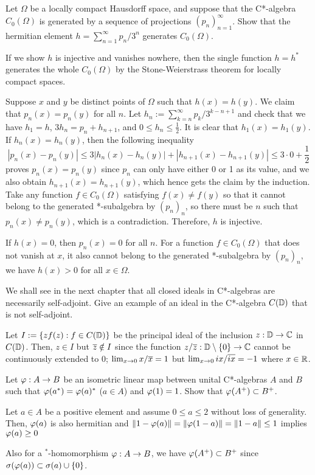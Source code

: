 \documentclass{../solution}
\begin{document}
\begin{prb}
Let $\Omega$ be a locally compact Hausdorff space, and suppose that the C*-algebra $C_0(\Omega)$ is generated by a sequence of projections $(p_n)_{n=1}^\infty$.
Show that the hermitian element $h=\sum_{n=1}^\infty p_n/3^n$ generates $C_0(\Omega)$.
\end{prb}
\begin{sol}
If we show $h$ is injective and vanishes nowhere, then the single function $h=h^*$ generates the whole $C_0(\Omega)$ by the Stone-Weierstrass theorem for locally compact spaces.

Suppose $x$ and $y$ be distinct points of $\Omega$ such that $h(x)=h(y)$.
We claim that $p_n(x)=p_n(y)$ for all $n$.
Let $h_n:=\sum_{k=n}^\infty p_k/3^{k-n+1}$ and check that we have $h_1=h$, $3h_n=p_n+h_{n+1}$, and $0\le h_n\le\frac12$.
It is clear that $h_1(x)=h_1(y)$.
If $h_n(x)=h_n(y)$, then the following inequality
\[|p_n(x)-p_n(y)|\le3|h_n(x)-h_n(y)|+|h_{n+1}(x)-h_{n+1}(y)|\le3\cdot0+\frac12\]
proves $p_n(x)=p_n(y)$ since $p_n$ can only have either 0 or 1 as its value, and we also obtain $h_{n+1}(x)=h_{n+1}(y)$, which hence gets the claim by the induction.
Take any function $f\in C_0(\Omega)$ satisfying $f(x)\ne f(y)$ so that it cannot belong to the generated *-subalgebra by $(p_n)_n$, so there must be $n$ such that $p_n(x)\ne p_n(y)$, which is a contradiction.
Therefore, $h$ is injective.

If $h(x)=0$, then $p_n(x)=0$ for all $n$.
For a function $f\in C_0(\Omega)$ that does not vanish at $x$, it also cannot belong to the generated *-subalgebra by $(p_n)_n$, we have $h(x)>0$ for all $x\in\Omega$.
\end{sol}


\begin{prb}
We shall see in the next chapter that all closed ideals in C*-algebras are necessarily self-adjoint.
Give an example of an ideal in the C*-algebra $C(\mathbb{D})$ that is not self-adjoint.
\end{prb}
\begin{sol}
Let $I:=\{zf(z):f\in C(\mathbb{D})\}$ be the principal ideal of the inclusion $z:\mathbb{D}\to\mathbb{C}$ in $C(\mathbb{D})$.
Then, $z\in I$ but $\overline z\notin I$ since the function $z/\overline z:\mathbb{D}\setminus\{0\}\to\mathbb{C}$ cannot be continuously extended to 0; $\lim_{x\to0}x/\overline{x}=1$ but $\lim_{x\to0}ix/\overline{ix}=-1$ where $x\in\mathbb{R}$.
\end{sol}


\begin{prb}
Let $\varphi:A\to B$ be an isometric linear map between unital C*-algebras $A$ and $B$ such that $\varphi(a^*)=\varphi(a)^*$ ($a\in A$) and $\varphi(1)=1$.
Show that $\varphi(A^+)\subset B^+$.
\end{prb}
\begin{sol}
Let $a\in A$ be a positive element and assume $0\le a\le2$ without loss of generality.
Then, $\varphi(a)$ is also hermitian and $\|1-\varphi(a)\|=\|\varphi(1-a)\|=\|1-a\|\le1$ implies $\varphi(a)\ge0$
\end{sol}
\begin{rmk}
Also for a $^*$-homomorphism $\varphi:A\to B$, we have $\varphi(A^+)\subset B^+$ since $\sigma(\varphi(a))\subset\sigma(a)\cup\{0\}$.
\end{rmk}
\end{document}
